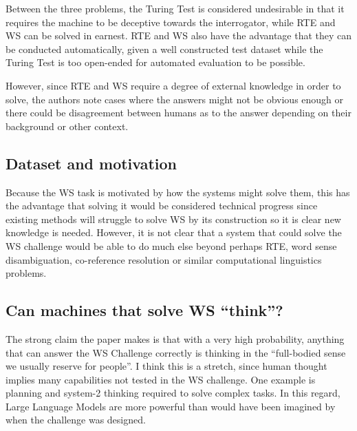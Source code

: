 \documentclass[
10pt, %
a4paper, %
oneside, %
headinclude,footinclude, %
BCOR5mm, %
]{scrartcl}
\begin{document}
Between the three problems, the Turing Test is considered undesirable in that it requires the machine to be deceptive towards the interrogator, while RTE and WS can be solved in earnest. RTE and WS also have the advantage that they can be conducted automatically, given a well constructed test dataset while the Turing Test is too open-ended for automated evaluation to be possible.

However, since RTE and WS require a degree of external knowledge in order to solve, the authors note cases where the answers might not be obvious enough or there could be disagreement between humans as to the answer depending on their background or other context.

\subsection{Dataset and motivation}


Because the WS task is motivated by how the systems might solve them, this has the advantage that solving it would be considered technical progress since existing methods will struggle to solve WS by its construction so it is clear new knowledge is needed. However, it is not clear that a system that could solve the WS challenge would be able to do much else beyond perhaps RTE, word sense disambiguation, co-reference resolution or similar computational linguistics problems.

\subsection{Can machines that solve WS ``think''?}


The strong claim the paper makes is that with a very high probability, anything that can answer the WS Challenge correctly is thinking in the ``full-bodied sense we usually reserve for people''. I think this is a stretch, since human thought implies many capabilities not tested in the WS challenge. One example is planning and system-2 thinking required to solve complex tasks. In this regard, Large Language Models are more powerful than would have been imagined by \citet{levesque2012winograd} when the challenge was designed.
\end{document}
